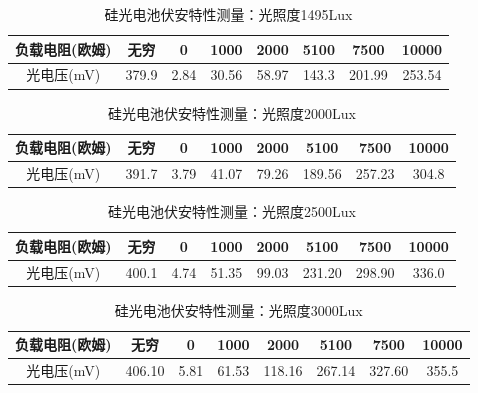\documentclass{ctexart}
\begin{document}
\begin{table}[H]
  \centering
  \begin{tabular}{|c|c|c|c|c|c|c|c|}
    \hline
    负载电阻(欧姆) &无穷&0&1000&2000&5100&7500&10000\\\hline
    光电压(mV) &379.9&2.84&30.56&58.97&143.3&201.99&253.54\\\hline
  \end{tabular}
  \caption{硅光电池伏安特性测量：光照度1495Lux}
\end{table}

\begin{table}[H]
  \centering
  \begin{tabular}{|c|c|c|c|c|c|c|c|}
    \hline
    负载电阻(欧姆) &无穷&0&1000&2000&5100&7500&10000\\\hline
    光电压(mV) &391.7&3.79&41.07&79.26&189.56&257.23&304.8\\\hline
  \end{tabular}
  \caption{硅光电池伏安特性测量：光照度2000Lux}
\end{table}

\begin{table}[H]
  \centering
  \begin{tabular}{|c|c|c|c|c|c|c|c|}
    \hline
    负载电阻(欧姆) &无穷&0&1000&2000&5100&7500&10000\\\hline
    光电压(mV) &400.1&4.74&51.35&99.03&231.20&298.90&336.0\\\hline
  \end{tabular}
  \caption{硅光电池伏安特性测量：光照度2500Lux}
\end{table}

\begin{table}[H]
  \centering
  \begin{tabular}{|c|c|c|c|c|c|c|c|}
    \hline
    负载电阻(欧姆) &无穷&0&1000&2000&5100&7500&10000\\\hline
    光电压(mV) &406.10&5.81&61.53&118.16&267.14&327.60&355.5\\\hline
  \end{tabular}
  \caption{硅光电池伏安特性测量：光照度3000Lux}
\end{table}
\end{document}
